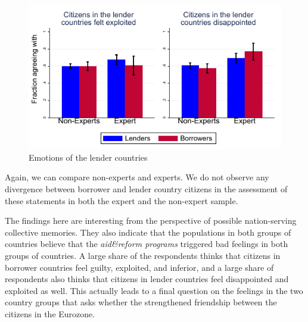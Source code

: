 \begin{figure}[h!]
    \centering
       \caption{Emotions of the lender countries}
    \includegraphics[scale=1.2]{graph5_2.pdf}
 
    \label{fig:my_label}
\end{figure}

Again, we can compare non-experts and experts. We do not observe any divergence 
between borrower and lender country citizens in the assessment of these statements in
both the expert and the non-expert sample. 

The findings here are interesting from the perspective of possible
nation-serving collective memories. They also indicate that the populations
in both groups of countries believe that the \textit{aid\&reform programs} triggered
bad feelings in both groups of countries. A large share of the respondents
thinks that citizens in borrower countries feel guilty, exploited, and
inferior, and a large share of respondents also thinks that citizens in
lender countries feel disappointed and exploited as well. This actually
leads to a final question on the feelings in the two country groups that
asks whether the  strengthened friendship between the
citizens in the Eurozone. 

